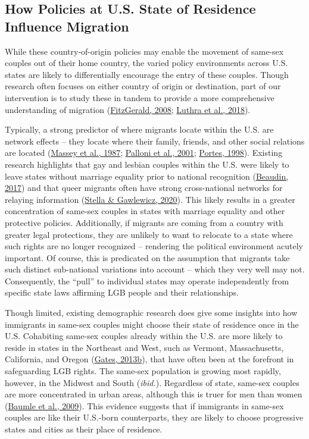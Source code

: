 \documentclass[
  12pt,
]{article}
\begin{document}
\hypertarget{how-policies-at-u.s.-state-of-residence-influence-migration}{%
\subsection{How Policies at U.S. State of Residence Influence Migration}\label{how-policies-at-u.s.-state-of-residence-influence-migration}}

While these country-of-origin policies may enable the movement of same-sex couples out of their home country, the varied policy environments across U.S. states are likely to differentially encourage the entry of these couples. Though research often focuses on either country of origin or destination, part of our intervention is to study these in tandem to provide a more comprehensive understanding of migration (\protect\hyperlink{ref-fitzgerald_2008}{FitzGerald, 2008}; \protect\hyperlink{ref-luthra_2018}{Luthra et al., 2018}).

Typically, a strong predictor of where migrants locate within the U.S. are network effects -- they locate where their family, friends, and other social relations are located (\protect\hyperlink{ref-massey_1987}{Massey et al., 1987}; \protect\hyperlink{ref-palloni_2001}{Palloni et al., 2001}; \protect\hyperlink{ref-portes_1998}{Portes, 1998}). Existing research highlights that gay and lesbian couples within the U.S. were likely to leave states without marriage equality prior to national recognition (\protect\hyperlink{ref-beaudin_2017}{Beaudin, 2017}) and that queer migrants often have strong cross-national networks for relaying information (\protect\hyperlink{ref-stella_2020}{Stella \& Gawlewicz, 2020}). This likely results in a greater concentration of same-sex couples in states with marriage equality and other protective policies. Additionally, if migrants are coming from a country with greater legal protections, they are unlikely to want to relocate to a state where such rights are no longer recognized -- rendering the political environment acutely important. Of course, this is predicated on the assumption that migrants take such distinct sub-national variations into account -- which they very well may not. Consequently, the ``pull'' to individual states may operate independently from specific state laws affirming LGB people and their relationships.

Though limited, existing demographic research does give some insights into how immigrants in same-sex couples might choose their state of residence once in the U.S. Cohabiting same-sex couples already within the U.S. are more likely to reside in states in the Northeast and West, such as Vermont, Massachusetts, California, and Oregon (\protect\hyperlink{ref-gates_2013a}{Gates, 2013b}), that have often been at the forefront in safeguarding LGB rights. The same-sex population is growing most rapidly, however, in the Midwest and South (\emph{ibid.}). Regardless of state, same-sex couples are more concentrated in urban areas, although this is truer for men than women (\protect\hyperlink{ref-baumle_2009}{Baumle et al., 2009}). This evidence suggests that if immigrants in same-sex couples are like their U.S.-born counterparts, they are likely to choose progressive states and cities as their place of residence.
\end{document}

